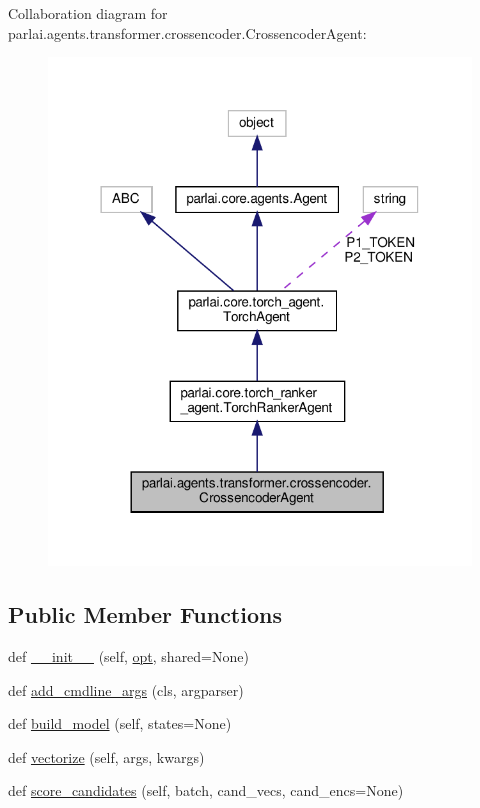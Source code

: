 Collaboration diagram for parlai.\+agents.\+transformer.\+crossencoder.\+Crossencoder\+Agent\+:
\nopagebreak
\begin{figure}[H]
\begin{center}
\leavevmode
\includegraphics[width=318pt]{classparlai_1_1agents_1_1transformer_1_1crossencoder_1_1CrossencoderAgent__coll__graph}
\end{center}
\end{figure}
\subsection*{Public Member Functions}
\begin{DoxyCompactItemize}
\item 
def \hyperlink{classparlai_1_1agents_1_1transformer_1_1crossencoder_1_1CrossencoderAgent_a22295a739ff290d96c45efd0bfd550bb}{\+\_\+\+\_\+init\+\_\+\+\_\+} (self, \hyperlink{classparlai_1_1core_1_1torch__agent_1_1TorchAgent_a785bb920cf8c8afc3e9bf6a8b77e335a}{opt}, shared=None)
\item 
def \hyperlink{classparlai_1_1agents_1_1transformer_1_1crossencoder_1_1CrossencoderAgent_a931cdceebd1eceb9c20638271c86af7a}{add\+\_\+cmdline\+\_\+args} (cls, argparser)
\item 
def \hyperlink{classparlai_1_1agents_1_1transformer_1_1crossencoder_1_1CrossencoderAgent_af63326f1f4d295e7a1a7fad4b07e077d}{build\+\_\+model} (self, states=None)
\item 
def \hyperlink{classparlai_1_1agents_1_1transformer_1_1crossencoder_1_1CrossencoderAgent_a736057f000f0d4cdb5d006e10c4291db}{vectorize} (self, args, kwargs)
\item 
def \hyperlink{classparlai_1_1agents_1_1transformer_1_1crossencoder_1_1CrossencoderAgent_a5c286ce0bc163e443e73182f95d6e0c6}{score\+\_\+candidates} (self, batch, cand\+\_\+vecs, cand\+\_\+encs=None)
\end{DoxyCompactItemize}

